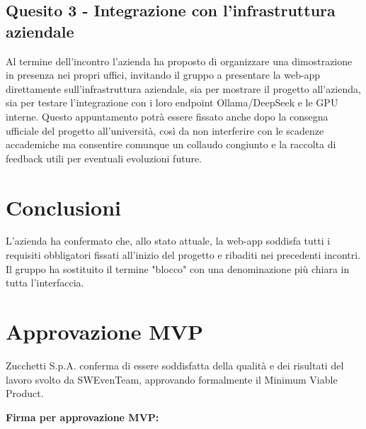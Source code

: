 \documentclass[10pt]{article}
\begin{document}
    \subsection{Quesito 3 - Integrazione con l'infrastruttura aziendale}
    Al termine dell’incontro l’azienda ha proposto di organizzare una dimostrazione in presenza nei propri uffici, invitando il gruppo a presentare la web-app direttamente sull’infrastruttura aziendale, sia per mostrare il progetto all'azienda, sia per testare l’integrazione con i loro endpoint Ollama/DeepSeek e le GPU interne. 
    Questo appuntamento potrà essere fissato anche dopo la consegna ufficiale del progetto all’università, così da non interferire con le scadenze accademiche ma consentire comunque un collaudo congiunto e la raccolta di feedback utili per eventuali evoluzioni future.

    \newpage
    
    \section{Conclusioni}
    L’azienda ha confermato che, allo stato attuale, la web-app soddisfa tutti i requisiti obbligatori fissati all’inizio del progetto e ribaditi nei precedenti incontri. 
    Il gruppo ha sostituito il termine "blocco" con una denominazione più chiara in tutta l’interfaccia.
    \newpage

    \section{Approvazione MVP}
    Zucchetti S.p.A. conferma di essere soddisfatta della qualità e dei risultati del lavoro svolto da SWEvenTeam, approvando formalmente il Minimum Viable Product.
    \begin{flushright}
    \textbf{Firma per approvazione MVP:}

    \vspace{1cm}

    \vspace{0.5cm}
    \end{flushright}
    
    \newpage
    \newpage
\end{document}

